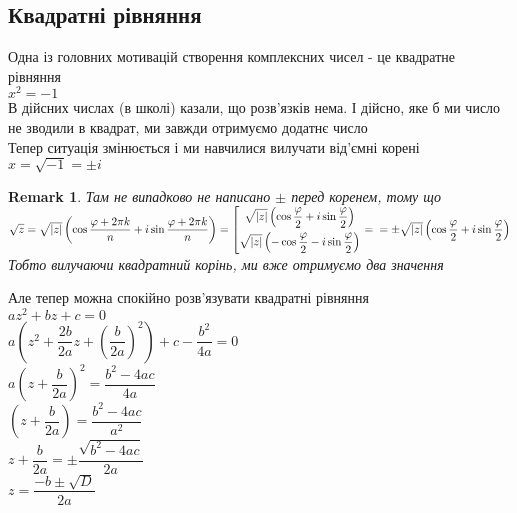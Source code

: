 \documentclass[a4paper, 14pt]{extarticle}
\theoremstyle{theoremdd}
\theoremstyle{theoremdd}
\theoremstyle{theoremdd}
\theoremstyle{theoremdd}
\theoremstyle{theoremdd}
\theoremstyle{theoremdd}
\newtheorem{remark}[theorem]{Remark}
\theoremstyle{theoremdd}
\theoremstyle{theoremdd}
\begin{document}
\subsection{Квадратні рівняння}
Одна із головних мотивацій створення комплексних чисел - це квадратне рівняння\\
$x^2 = -1$\\
В дійсних числах (в школі) казали, що розв'язків нема. І дійсно, яке б ми число не зводили в квадрат, ми завжди отримуємо додатнє число\\
Тепер ситуація змінюється і ми навчилися вилучати від'ємні корені\\
$x = \sqrt{-1} = \pm i$
\begin{remark}
Там не випадково не написано $\pm$ перед коренем, тому що\\
$\sqrt{z} = \sqrt{|z|} \left( \cos \dfrac{\varphi + 2 \pi k}{n} + i \sin \dfrac{\varphi + 2 \pi k}{n} \right) = \left[ \begin{gathered} \sqrt{|z|} \left(\cos \dfrac{\varphi}{2} + i \sin \dfrac{\varphi}{2} \right) \\ \sqrt{|z|} \left(-\cos \dfrac{\varphi}{2} - i \sin \dfrac{\varphi}{2} \right) \end{gathered} \right. = \\ = \pm \sqrt{|z|} \left(\cos \dfrac{\varphi}{2} + i \sin \dfrac{\varphi}{2} \right)$\\
Тобто вилучаючи квадратний корінь, ми вже отримуємо два значення
\end{remark}
Але тепер можна спокійно розв'язувати квадратні рівняння\\
$az^2 + bz + c = 0$\\
$a \left( z^2 + \dfrac{2b}{2a}z + \left(\dfrac{b}{2a} \right)^2 \right) + c - \dfrac{b^2}{4a} = 0$\\
$a \left(z + \dfrac{b}{2a} \right)^2 = \dfrac{b^2-4ac}{4a}$\\
$\left(z + \dfrac{b}{2a} \right) = \dfrac{b^2-4ac}{a^2}$\\
$z + \dfrac{b}{2a} = \pm \dfrac{\sqrt{b^2-4ac}}{2a}$\\
$z = \dfrac{-b\pm \sqrt{D}}{2a}$\\
\end{document}
